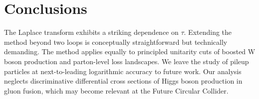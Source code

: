 \section{Conclusions}\label{sec:conclusions}

The Laplace transform exhibits a striking dependence on $\tau$.
Extending the method beyond two loops is conceptually straightforward
but technically demanding. The method applies equally to principled
unitarity cuts of boosted W boson production and parton-level loss
landscapes. We leave the study of pileup particles at next-to-leading
logarithmic accuracy to future work. Our analysis neglects
discriminative differential cross sections of Higgs boson production in
gluon fusion, which may become relevant at the Future Circular Collider.

